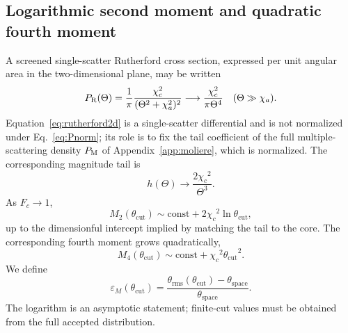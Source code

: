 \documentclass[aps,pra,reprint,longbibliography,floatfix]{revtex4-2}
\newcommand{\epsM}{\ensuremath{\varepsilon_M}}
\newcommand{\thetaspace}{\ensuremath{\theta_{\mathrm{space}}}}
\newcommand{\thetarms}{\ensuremath{\theta_{\mathrm{rms}}}}
\newcommand{\thetacut}{\ensuremath{\theta_{\mathrm{cut}}}}
\newcommand{\chic}{\ensuremath{\chi_c}}
\newcommand{\chia}{\ensuremath{\chi_a}}
\begin{document}
\subsection{Logarithmic second moment and quadratic fourth moment}\label{sec:tails}
A screened single-scatter Rutherford cross section, expressed per unit angular area in the two-dimensional plane, may be written~\cite{moliere1948,bethe1953,scott1963,bondarenco2016}
\begin{equation}\label{eq:rutherford2d}
P_{\rm R}(\Theta)=\frac{1}{\pi}\frac{\chic^2}{(\Theta^2+\chia^2)^2}
\longrightarrow \frac{\chic^2}{\pi\Theta^4}
\quad(\Theta\gg\chia).
\end{equation}
Equation~\eqref{eq:rutherford2d} is a single-scatter differential and is not normalized under Eq.~\eqref{eq:Pnorm}; its role is to fix the tail coefficient of the full multiple-scattering density $P_{\rm M}$ of Appendix~\ref{app:moliere}, which is normalized.  The corresponding magnitude tail is
\begin{equation}\label{eq:tail}
h(\Theta)\longrightarrow \frac{2\chic^2}{\Theta^3}.
\end{equation}
As $F_c\rightarrow1$,
\begin{equation}\label{eq:secondmoment}
M_2(\thetacut)\sim \mathrm{const}+2\chic^2\ln\thetacut,
\end{equation}
up to the dimensionful intercept implied by matching the tail to the core.  The corresponding fourth moment grows quadratically,
\begin{equation}\label{eq:m4}
M_4(\thetacut)\sim \mathrm{const}+\chic^2\thetacut^2.
\end{equation}
We define
\begin{equation}\label{eq:epsM}
\epsM(\thetacut)=\frac{\thetarms(\thetacut)-\thetaspace}{\thetaspace}.
\end{equation}
The logarithm is an asymptotic statement; finite-cut values must be obtained from the full accepted distribution.
\end{document}
